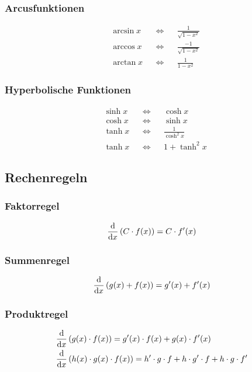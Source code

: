\begin{multicols}{2}
\subsubsection*{Arcusfunktionen}
 \begin{align*} 
  &\arcsin x& &\Longleftrightarrow& &\frac{1}{\sqrt{1-x^2}}\\
  &\arccos x& &\Longleftrightarrow& &\frac{-1}{\sqrt{1-x^2}}\\
  &\arctan x& &\Longleftrightarrow& &\frac{1}{1-x^2}
\end{align*}
\vfill
\subsubsection*{Hyperbolische Funktionen}
 \begin{align*} 
  &\sinh x& &\Longleftrightarrow& &\cosh x\\
  &\cosh x& &\Longleftrightarrow& &\sinh x\\
  &\tanh x& &\Longleftrightarrow& &\frac{1}{\cosh^2 x}\\
  &\tanh x& &\Longleftrightarrow& &1+\tanh^2 x
\end{align*}
\vfill
\end{multicols}

\newpage
\subsection{Rechenregeln}
\begin{multicols}{2}
\subsubsection*{Faktorregel}
 \begin{align*} 
\frac{\mathop{}\!\mathrm{d} }{\mathop{}\!\mathrm{d} x}\left(C\cdot f(x)\right)=C\cdot f'(x)
 \end{align*}
\vfill
\subsubsection*{Summenregel}
 \begin{align*} 
\frac{\mathop{}\!\mathrm{d} }{\mathop{}\!\mathrm{d} x}\left(g(x) + f(x)\right)=g'(x)+f'(x)
 \end{align*}
\vfill
\end{multicols}


\subsubsection*{Produktregel}
 \begin{align*} 
\frac{\mathop{}\!\mathrm{d} }{\mathop{}\!\mathrm{d} x}&\left(g(x)\cdot f(x)\right)=g'(x)\cdot f(x)+g(x)\cdot f'(x)\\
\frac{\mathop{}\!\mathrm{d} }{\mathop{}\!\mathrm{d} x}&\left(h(x)\cdot g(x)\cdot f(x)\right)=h'\cdot g\cdot f+h\cdot g'\cdot f+h\cdot g\cdot f'
 \end{align*}

